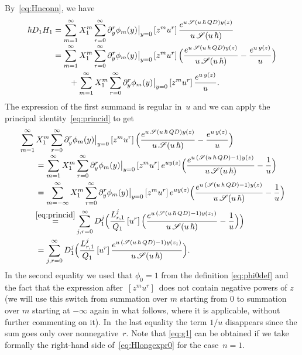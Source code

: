 \documentclass[11pt]{article}
\let\mathcal\mathscr
\theoremstyle{plain}
\theoremstyle{definition}
\theoremstyle{remark}
\newcommand{\cS}{\mathcal{S}}
\begin{document}
By~\eqref{eq:Hnconn}, we have\vspace*{-3pt}
\begin{equation}
\begin{aligned}\label{eq:DHg1step1}
\hbar D_1H_{1}
&=\sum_{m=1}^\infty X_1^m\sum_{r=0}^\infty
\partial_y^r\phi_m(y)\big|_{y=0}\,[z^{m}u^r]\,
\frac{e^{u\,\cS(u\,\hbar\,Q D)y(z)}}{u\,\cS(u\,\hbar)}\\[-2pt]
&=\sum_{m=1}^\infty X_1^m\sum_{r=0}^\infty
\partial_y^r\phi_m(y)\big|_{y=0}\,[z^{m}u^r]\,\Bigl(
\frac{e^{u\,\cS(u\,\hbar\,Q D)y(z)}}{u\,\cS(u\,\hbar)}-
\frac{e^{u\,y(z)}}{u}\Bigr)
\\
&\qquad
+\sum_{m=1}^\infty X_1^m\sum_{r=0}^\infty
\partial_y^r\phi_m(y)\big|_{y=0}\,[z^{m}u^r]\,
\frac{e^{u\,y(z)}}{u}.
\end{aligned}
\end{equation}
The expression of the first summand is regular in~$u$ and we can apply the principal identity~\eqref{eq:princid} to get\vspace*{-3pt}
\begin{equation}\label{eq:g1}
\begin{aligned}
&\sum_{m=1}^\infty X_1^m\sum_{r=0}^\infty
\partial_y^r\phi_m(y)\big|_{y=0}\,[z^{m}u^r]\,\Bigl(
\frac{e^{u\,\cS(u\,\hbar\,Q D)y(z)}}{u\,\cS(u\,\hbar)}-
\frac{e^{u\,y(z)}}{u}\Bigr)\\[-2pt]
&\qquad=\sum_{m=1}^\infty X_1^m\sum_{r=0}^\infty
\partial_y^r\phi_m(y)\big|_{y=0}\,[z^{m}u^r]\,e^{uy(z)}\Bigl(
\frac{e^{u\,(\cS(u\,\hbar\,Q D)-1)y(z)}}{u\,\cS(u\,\hbar)}-
\frac{1}{u}\Bigr)\\
&\qquad=\sum_{m=-\infty}^\infty X_1^m\sum_{r=0}^\infty
\partial_y^r\phi_m(y)\big|_{y=0}\,[z^{m}u^r]\,e^{uy(z)}\Bigl(
\frac{e^{u\,(\cS(u\,\hbar\,Q D)-1)y(z)}}{u\,\cS(u\,\hbar)}-
\frac{1}{u}\Bigr)\\
&\qquad\!\mathop{=}^{\eqref{eq:princid}}
\sum_{j,r=0}^\infty D_1^j \Bigl(\frac{L_{r,1}^j}{Q_1}
\,[u^r]\, \Bigl(\frac{e^{u\,(\cS(u\,\hbar\,Q D)-1)y(z_1)}}{u\,\cS(u\,\hbar)}-\dfrac{1}{u} \Bigr) \Bigr)\\
&\qquad=
\sum_{j,r=0}^\infty D_1^j \Bigl(\frac{L_{r,1}^j}{Q_1}
\,[u^r]\, \frac{e^{u\,(\cS(u\,\hbar\,Q D)-1)y(z_1)}}{u\,\cS(u\,\hbar)} \Bigr).
\end{aligned}
\end{equation}
In the second equality we used that $\phi_0=1$ from the definition \eqref{eq:phi0def} and the fact that the expression after $\,[z^mu^r]\,$ does not contain negative powers of $z$ (we will use this switch from summation over $m$ starting from $0$ to summation over $m$ starting at $-\infty$ again in what follows, where it is applicable, without further commenting on it).
In~the last equality the term $1/u$ disappears since the sum goes only over nonnegative~$r$.
Note that \eqref{eq:g1} can be obtained if we take formally the right-hand side of~\eqref{eq:Hlongexpr0} for the case~$n=1$.
\end{document}
